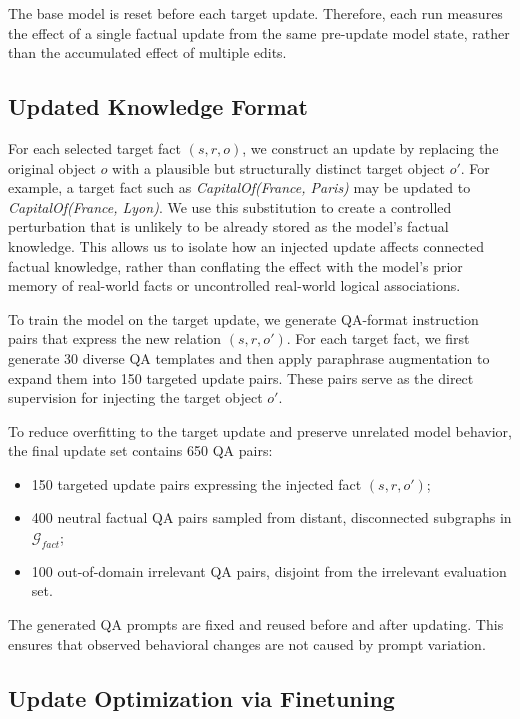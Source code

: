 The base model is reset before each target update. Therefore, each run measures the effect of a single factual update from the same pre-update model state, rather than the accumulated effect of multiple edits.


\subsection{Updated Knowledge Format}

For each selected target fact $(s,r,o)$, we construct an update by replacing the original object $o$ with a plausible but structurally distinct target object $o'$. For example, a target fact such as \textit{CapitalOf(France, Paris)} may be updated to \textit{CapitalOf(France, Lyon)}. We use this substitution to create a controlled perturbation that is unlikely to be already stored as the model's factual knowledge. This allows us to isolate how an injected update affects connected factual knowledge, rather than conflating the effect with the model's prior memory of real-world facts or uncontrolled real-world logical associations.

To train the model on the target update, we generate QA-format instruction pairs that express the new relation $(s,r,o')$. For each target fact, we first generate 30 diverse QA templates and then apply paraphrase augmentation to expand them into 150 targeted update pairs. These pairs serve as the direct supervision for injecting the target object $o'$.

To reduce overfitting to the target update and preserve unrelated model behavior, the final update set contains 650 QA pairs:

\begin{itemize}
    \setlength\itemsep{0em}
    \item 150 targeted update pairs expressing the injected fact $(s,r,o')$;
    \item 400 neutral factual QA pairs sampled from distant, disconnected subgraphs in $\mathcal{G}_{fact}$;
    \item 100 out-of-domain irrelevant QA pairs, disjoint from the irrelevant evaluation set.
\end{itemize}

The generated QA prompts are fixed and reused before and after updating. This ensures that observed behavioral changes are not caused by prompt variation.

\subsection{Update Optimization via Finetuning}

